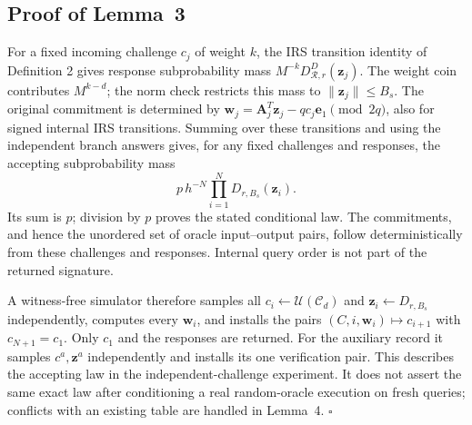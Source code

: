 \documentclass[lettersize,journal]{IEEEtran}
\newenvironment{proof}{{\noindent\it Proof:} }{\hfill $\square$\par}
\begin{document}
\subsection{Proof of Lemma~3}
\label{app:proof-cyclic-transcripts}
\begin{proof}
	For a fixed incoming challenge $c_j$ of weight $k$, the IRS transition identity of Definition 2 gives response subprobability mass $M^{-k}D_{\mathcal R,r}^{D}(\mathbf z_j)$. The weight coin contributes $M^{k-d}$; the norm check restricts this mass to $\|\mathbf z_j\|\le B_s$. The original commitment is determined by
	$\mathbf w_j=\mathbf A_j^T\mathbf z_j-qc_j\mathbf e_1\pmod{2q}$,
	also for signed internal IRS transitions. Summing over these transitions and using the independent branch answers gives, for any fixed challenges and responses, the accepting subprobability mass
	\begin{equation}\label{eq:cyclic-ideal-mass}
		p\,h^{-N}\prod_{i=1}^{N}D_{r,B_s}(\mathbf z_i).
	\end{equation}
	Its sum is $p$; division by $p$ proves the stated conditional law. The commitments, and hence the unordered set of oracle input--output pairs, follow deterministically from these challenges and responses. Internal query order is not part of the returned signature.
	
	A witness-free simulator therefore samples all $c_i\leftarrow\mathcal U(\mathcal C_d)$ and $\mathbf z_i\leftarrow D_{r,B_s}$ independently, computes every $\mathbf w_i$, and installs the pairs $(C,i,\mathbf w_i)\mapsto c_{i+1}$ with $c_{N+1}=c_1$. Only $c_1$ and the responses are returned. For the auxiliary record it samples $c^a,\mathbf z^a$ independently and installs its one verification pair. This describes the accepting law in the independent-challenge experiment. It does not assert the same exact law after conditioning a real random-oracle execution on fresh queries; conflicts with an existing table are handled in Lemma~4.
\end{proof}
\end{document}
